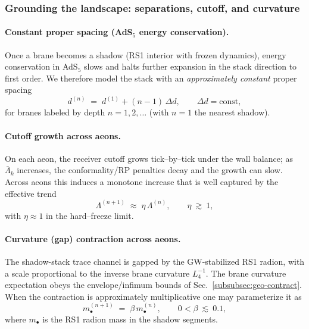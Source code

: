 \documentclass[10pt]{article}
\theoremstyle{definition}
\theoremstyle{plain}
\begin{document}
\subsubsection*{Grounding the landscape: separations, cutoff, and curvature}
\label{subsubsec:grounding}

\paragraph{Constant proper spacing (AdS$_5$ energy conservation).}\label{par:uom-main-179}
Once a brane becomes a shadow (RS1 interior with frozen dynamics), energy conservation in AdS$_5$ slows and halts further expansion in the stack direction to first order. We therefore model the stack with an \emph{approximately constant} proper spacing
\begin{equation}
d^{(n)} \;=\; d^{(1)} + (n-1)\,\Delta d,\qquad \Delta d=\text{const},
\label{eq:spacing}
\end{equation}
for branes labeled by depth $n=1,2,\dots$ (with $n=1$ the nearest shadow).

\paragraph{Cutoff growth across aeons.}\label{par:uom-main-180}
On each aeon, the receiver cutoff grows tick–by–tick under the wall balance; as $\bar\Lambda_k$ increases, the conformality/RP penalties decay and the growth can slow. Across aeons this induces a monotone increase that is well captured by the effective trend
\begin{equation}
\Lambda^{(n+1)}\;\approx\;\eta\,\Lambda^{(n)},\qquad \eta\ \gtrsim\ 1,
\label{eq:cutoff-growth}
\end{equation}
with $\eta\approx 1$ in the hard–freeze limit.

\paragraph{Curvature (gap) contraction across aeons.}\label{par:uom-main-181}
The shadow-stack trace channel is gapped by the GW-stabilized RS1 radion, with a scale proportional to the inverse brane curvature $L_4^{-1}$. The brane curvature expectation obeys the envelope/infimum bounds of Sec.~\ref{subsubsec:geo-contract}. When the contraction is approximately multiplicative one may parameterize it as
\begin{equation}
m_\bullet^{(n+1)}\;=\;\beta\,m_\bullet^{(n)},\qquad 0<\beta\ \lesssim\ 0.1,
\label{eq:gap-decay}
\end{equation}
where $m_\bullet$ is the RS1 radion mass in the shadow segments.
\end{document}
